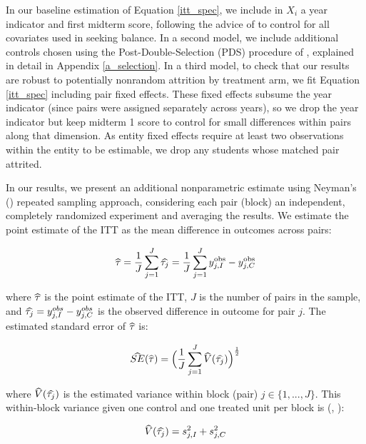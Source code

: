 \documentclass[12pt]{article}
\newcommand\wh[1]{\hstretch{2}{\hat{\hstretch{.5}{#1}}}}
\begin{document}
In our baseline estimation of Equation \ref{itt_spec}, we include in $X_i$ a year indicator and first midterm score, following the advice of \textcite{bm2009} to control for all covariates used in seeking balance. In a second model, we include additional controls chosen using the Post-Double-Selection (PDS) procedure of \textcite{bch2014a}, explained in detail in Appendix \ref{a_selection}. In a third model, to check that our results are robust to potentially nonrandom attrition by treatment arm, we fit Equation \ref{itt_spec} including pair fixed effects. These fixed effects subsume the year indicator (since pairs were assigned separately across years), so we drop the year indicator but keep midterm 1 score to control for small differences within pairs along that dimension. As entity fixed effects require at least two observations within the entity to be estimable, we drop any students whose matched pair attrited.

In our results, we present an additional nonparametric estimate using Neyman's (\citeyear{neyman1923}) repeated sampling approach, considering each pair (block) an independent, completely randomized experiment and averaging the results. We estimate the point estimate of the ITT as the mean difference in outcomes across pairs:

\begin{equation} \label{neyman_spec}
	\wh{\tau} = \frac{1}{J}\sum_{j=1}^{J} \wh{\tau_j} = \frac{1}{J}\sum_{j=1}^{J} y^\text{obs}_{j,I} - y^\text{obs}_{j,C}
\end{equation}

where $\wh{\tau}$ is the point estimate of the ITT, $J$ is the number of pairs in the sample, and $\wh{\tau_j} = y^{obs}_{j,I} - y^{obs}_{j,C}$ is the observed difference in outcome for pair $j$. The estimated standard error of $\wh{\tau}$ \citep{imai2008, ir2015, ai2017} is:

\begin{equation} \label{se_neyman}
	\wh{SE}(\wh{\tau}) = \Big(\frac{1}{J}\sum_{j=1}^{J} \wh{V}(\wh{\tau_j}) \Big)^\frac{1}{2}
\end{equation}

where $\wh{V}(\wh{\tau_j})$ is the estimated variance within block (pair) $j\in \{1,...,J\}$. This within-block variance given one control and one treated unit per block is (\cite{ir2015}, \cite{ai2017}):

\begin{equation} \label{v_block}
	\wh{V}(\wh{\tau_j}) = s_{j, I}^2 + s_{j, C}^2
\end{equation}
\end{document}

